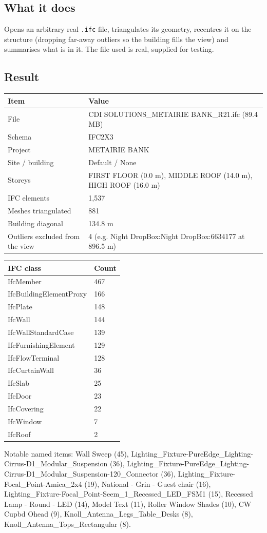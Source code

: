 \documentclass[10pt]{article}
\begin{document}
\subsection{What it does}
Opens an arbitrary real \texttt{.ifc} file, triangulates its geometry, recentres it on the structure (dropping far-away
outliers so the building fills the view) and summarises what is in it. The file used is real, supplied for testing.

\subsection{Result}
{\small \begin{longtable}{p{4.2cm}p{11.8cm}}
\toprule
\textbf{Item} & \textbf{Value} \\ \midrule \endhead
File & CDI SOLUTIONS\_METAIRIE BANK\_R21.ifc (89.4 MB) \\
Schema & IFC2X3 \\
Project & METAIRIE BANK \\
Site / building & Default / None \\
Storeys & FIRST FLOOR (0.0 m), MIDDLE ROOF (14.0 m), HIGH ROOF (16.0 m) \\
IFC elements & 1,537 \\
Meshes triangulated & 881 \\
Building diagonal & 134.8 m \\
Outliers excluded from the view & 4 (e.g. Night DropBox:Night DropBox:6634177 at 896.5 m) \\
\bottomrule
\end{longtable}}
{\small \begin{longtable}{p{7cm}p{3cm}}
\toprule
\textbf{IFC class} & \textbf{Count} \\ \midrule \endhead
IfcMember & 467 \\
IfcBuildingElementProxy & 166 \\
IfcPlate & 148 \\
IfcWall & 144 \\
IfcWallStandardCase & 139 \\
IfcFurnishingElement & 129 \\
IfcFlowTerminal & 128 \\
IfcCurtainWall & 36 \\
IfcSlab & 25 \\
IfcDoor & 23 \\
IfcCovering & 22 \\
IfcWindow & 7 \\
IfcRoof & 2 \\
\bottomrule
\end{longtable}}
Notable named items: Wall Sweep (45), Lighting\_Fixture-PureEdge\_Lighting-Cirrus-D1\_Modular\_Suspension (36), Lighting\_Fixture-PureEdge\_Lighting-Cirrus-D1\_Modular\_Suspension-120\_Connector (36), Lighting\_Fixture-Focal\_Point-Amica\_2x4 (19), National - Grin - Guest chair (16), Lighting\_Fixture-Focal\_Point-Seem\_1\_Recessed\_LED\_FSM1 (15), Recessed Lamp - Round - LED (14), Model Text (11), Roller Window Shades (10), CW Cupbd Ohead (9), Knoll\_Antenna\_Legs\_Table\_Desks (8), Knoll\_Antenna\_Tops\_Rectangular (8).
\end{document}
